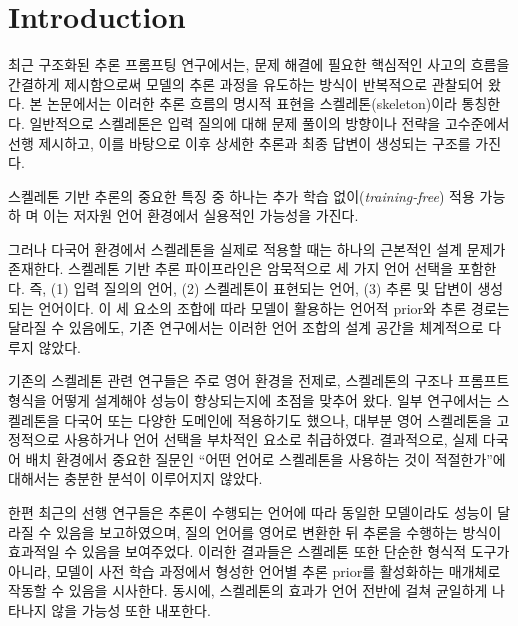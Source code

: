 \section{Introduction}
최근 구조화된 추론 프롬프팅 연구에서는, 문제 해결에 필요한 핵심적인 사고의 흐름을 간결하게 제시함으로써 모델의 추론 과정을 유도하는 방식이 반복적으로 관찰되어 왔다. 본 논문에서는 이러한 추론 흐름의 명시적 표현을 스켈레톤(skeleton)이라 통칭한다. 일반적으로 스켈레톤은 입력 질의에 대해 문제 풀이의 방향이나 전략을 고수준에서 선행 제시하고, 이를 바탕으로 이후 상세한 추론과 최종 답변이 생성되는 구조를 가진다.

스켈레톤 기반 추론의 중요한 특징 중 하나는 추가 학습 없이(\emph{training-free}) 적용 가능하%
며 이는 저자원 언어 환경에서 실용적인 가능성을 가진다.

그러나 다국어 환경에서 스켈레톤을 실제로 적용할 때는 하나의 근본적인 설계 문제가 존재한다. 스켈레톤 기반 추론 파이프라인은 암묵적으로 세 가지 언어 선택을 포함한다. 즉, (1) 입력 질의의 언어, (2) 스켈레톤이 표현되는 언어, (3) 추론 및 답변이 생성되는 언어이다. 이 세 요소의 조합에 따라 모델이 활용하는 언어적 prior와 추론 경로는 달라질 수 있음에도, 기존 연구에서는 이러한 언어 조합의 설계 공간을 체계적으로 다루지 않았다.

기존의 스켈레톤 관련 연구들은 주로 영어 환경을 전제로, 스켈레톤의 구조나 프롬프트 형식을 어떻게 설계해야 성능이 향상되는지에 초점을 맞추어 왔다. 일부 연구에서는 스켈레톤을 다국어 또는 다양한 도메인에 적용하기도 했으나, 대부분 영어 스켈레톤을 고정적으로 사용하거나 언어 선택을 부차적인 요소로 취급하였다. 결과적으로, 실제 다국어 배치 환경에서 중요한 질문인 “어떤 언어로 스켈레톤을 사용하는 것이 적절한가”에 대해서는 충분한 분석이 이루어지지 않았다.

한편 최근의 선행 연구들은 추론이 수행되는 언어에 따라 동일한 모델이라도 성능이 달라질 수 있음을 보고하였으며, 질의 언어를 영어로 변환한 뒤 추론을 수행하는 방식이 효과적일 수 있음을 보여주었다. 이러한 결과들은 스켈레톤 또한 단순한 형식적 도구가 아니라, 모델이 사전 학습 과정에서 형성한 언어별 추론 prior를 활성화하는 매개체로 작동할 수 있음을 시사한다. 동시에, 스켈레톤의 효과가 언어 전반에 걸쳐 균일하게 나타나지 않을 가능성 또한 내포한다.

